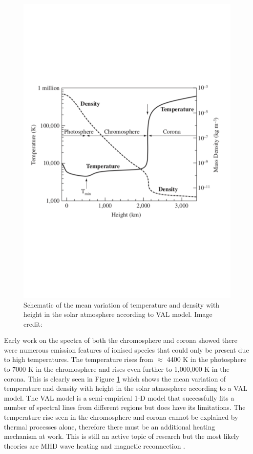\begin{figure}
    \centering
    \includegraphics[scale=0.5]{Figures/1-Introduction/val_model_MHD_of_Sun_textbook.pdf}
    \caption[VAL model that shows the mean variation of temperature and density with height in the solar atmosphere]{Schematic of the mean variation of temperature and density with height in the solar atmosphere according to VAL model. Image credit: \citet{Priest_2014_MHD_sun}}
    \label{fig:val_model}
\end{figure}

Early work on the spectra of both the chromosphere and corona showed there were numerous emission features of ionised species that could only be present due to high temperatures. The temperature rises from $\approx$ 4400 K in the photosphere to 7000 K in the chromosphere and rises even further to 1,000,000 K in the corona. This is clearly seen in Figure \ref{fig:val_model} which shows the mean variation of temperature and density with height in the solar atmosphere according to a VAL model. The VAL model \citep{Vernazza_etal_1981} is a semi-empirical 1-D model that successfully fits a number of spectral lines from different regions but does have its limitations. The temperature rise seen in the chromosphere and corona cannot be explained by thermal processes alone, therefore there must be an additional heating mechanism at work. This is still an active topic of research but the most likely theories are MHD wave heating and magnetic reconnection \citep{Parnell_DeMoortel_2012}.

